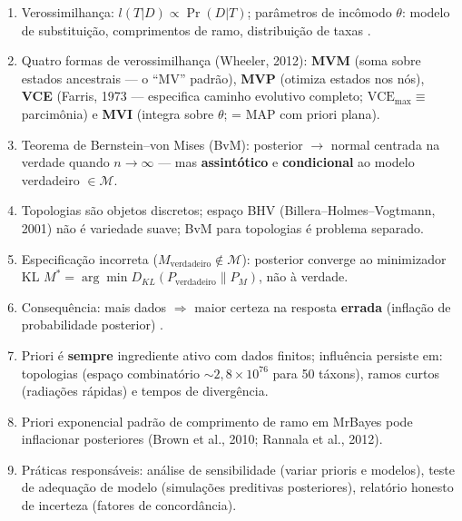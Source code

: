 \clearpage
\begin{revise}
\begin{enumerate}
    \item Verossimilhança: $l(T|D) \propto \Pr(D|T)$; parâmetros de incômodo $\theta$: modelo de substituição, comprimentos de ramo, distribuição de taxas \parencite{edwards1972,wheeler2012}.
    \item Quatro formas de verossimilhança (Wheeler, 2012): \textbf{MVM} (soma sobre estados ancestrais --- o ``MV'' padrão), \textbf{MVP} (otimiza estados nos nós), \textbf{VCE} (Farris, 1973 --- especifica caminho evolutivo completo; $\text{VCE}_{\max} \equiv$ parcimônia) e \textbf{MVI} (integra sobre $\theta$; = MAP com priori plana).
    \item Teorema de Bernstein--von Mises (BvM): posterior $\to$ normal centrada na verdade quando $n\to\infty$ --- mas \textbf{assintótico} e \textbf{condicional} ao modelo verdadeiro $\in \mathcal{M}$.
    \item Topologias são objetos discretos; espaço BHV (Billera--Holmes--Vogtmann, 2001) não é variedade suave; BvM para topologias é problema separado.
    \item Especificação incorreta ($M_{\text{verdadeiro}} \notin \mathcal{M}$): posterior converge ao minimizador KL $M^* = \arg\min D_{KL}(P_{\text{verdadeiro}} \| P_M)$, não à verdade.
    \item Consequência: mais dados $\Rightarrow$ maior certeza na resposta \textbf{errada} (inflação de probabilidade posterior) \parencite{suzuki2002,kumar2012}.
    \item Priori é \textbf{sempre} ingrediente ativo com dados finitos; influência persiste em: topologias (espaço combinatório $\sim 2{,}8\times 10^{76}$ para 50 táxons), ramos curtos (radiações rápidas) e tempos de divergência.
    \item Priori exponencial padrão de comprimento de ramo em MrBayes pode inflacionar posteriores (Brown et al., 2010; Rannala et al., 2012).
    \item Práticas responsáveis: análise de sensibilidade (variar prioris e modelos), teste de adequação de modelo (simulações preditivas posteriores), relatório honesto de incerteza (fatores de concordância).
\end{enumerate}
\end{revise}

\clearpage

\printbibliography[heading=subbibliography,title={Referências}]

